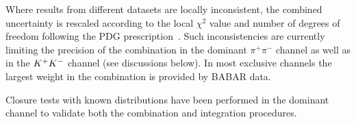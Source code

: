 Where results from different datasets are locally inconsistent, the combined uncertainty is rescaled according to the local $\chi^2$ value and number of degrees of freedom following the PDG prescription~\cite{pdg}. Such inconsistencies are currently limiting the precision of the combination in the dominant $\pi^+\pi^-$ channel as well as in the $K^+K^-$ channel  (see discussions below). In most exclusive channels the largest weight in the combination is provided by BABAR data. 

Closure tests with known distributions have been performed in the dominant \pipi channel to validate both the combination and integration procedures.
